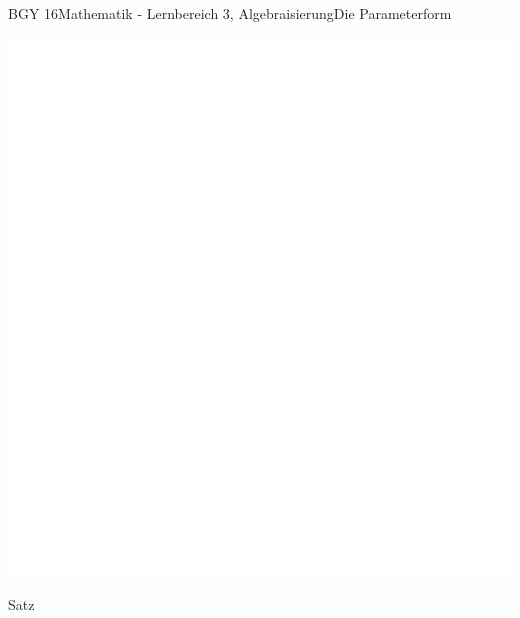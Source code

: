 \documentclass[oneside,openany,headings=optiontotoc,11pt,numbers=noenddot]{scrreprt}
\begin{document}
\begin{worksheet}{BGY 16}{Mathematik - Lernbereich 3, Algebraisierung}{Die Parameterform}
\begin{framed}
			\includegraphics[scale=1.14]{../empty.jpg}
		\end{framed}
		\begin{framed}
			\tiny{\color{codegray}Satz}
			\noindent
			\begin{center}
				\begin{tabularx}{\textwidth}{Xr}

\end{tabularx}
\end{center}
\end{framed}
\end{worksheet}
\end{document}
